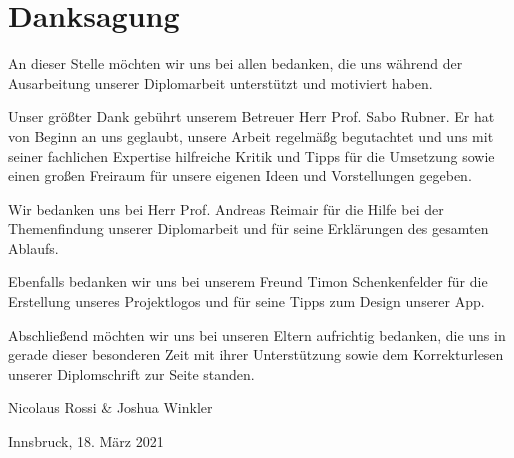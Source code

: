 \section*{Danksagung}

An dieser Stelle möchten wir uns bei allen bedanken, die uns während der Ausarbeitung unserer Diplomarbeit unterstützt und motiviert haben.

Unser größter Dank gebührt unserem Betreuer Herr Prof. Sabo Rubner. Er hat von Beginn an uns geglaubt, unsere Arbeit regelmäßg begutachtet und uns mit seiner fachlichen Expertise hilfreiche Kritik und Tipps für die Umsetzung sowie einen großen Freiraum für unsere eigenen Ideen und Vorstellungen gegeben.

Wir bedanken uns bei Herr Prof. Andreas Reimair für die Hilfe bei der Themenfindung unserer Diplomarbeit und für seine Erklärungen des gesamten Ablaufs.

Ebenfalls bedanken wir uns bei unserem Freund Timon Schenkenfelder für die Erstellung unseres Projektlogos und für seine Tipps zum Design unserer App.

Abschließend möchten wir uns bei unseren Eltern aufrichtig bedanken, die uns in gerade dieser besonderen Zeit mit ihrer Unterstützung sowie dem Korrekturlesen unserer Diplomschrift zur Seite standen.

\vspace{1cm}

Nicolaus Rossi \& Joshua Winkler

Innsbruck, 18. März 2021

\newpage